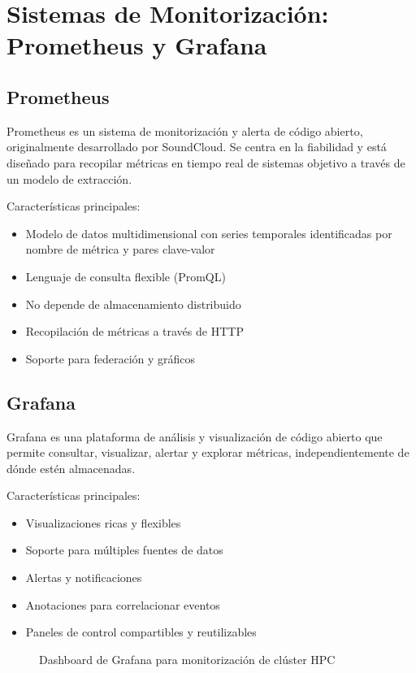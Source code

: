 \documentclass[12pt,a4paper]{report}
\begin{document}
\section{Sistemas de Monitorización: Prometheus y Grafana}

\subsection{Prometheus}

Prometheus es un sistema de monitorización y alerta de código abierto, originalmente desarrollado por SoundCloud. Se centra en la fiabilidad y está diseñado para recopilar métricas en tiempo real de sistemas objetivo a través de un modelo de extracción.

Características principales:
\begin{itemize}
    \item Modelo de datos multidimensional con series temporales identificadas por nombre de métrica y pares clave-valor
    \item Lenguaje de consulta flexible (PromQL)
    \item No depende de almacenamiento distribuido
    \item Recopilación de métricas a través de HTTP
    \item Soporte para federación y gráficos
\end{itemize}

\subsection{Grafana}

Grafana es una plataforma de análisis y visualización de código abierto que permite consultar, visualizar, alertar y explorar métricas, independientemente de dónde estén almacenadas.

Características principales:
\begin{itemize}
    \item Visualizaciones ricas y flexibles
    \item Soporte para múltiples fuentes de datos
    \item Alertas y notificaciones
    \item Anotaciones para correlacionar eventos
    \item Paneles de control compartibles y reutilizables
\end{itemize}

\begin{figure}[H]
\centering
\caption{Dashboard de Grafana para monitorización de clúster HPC}
\label{fig:grafana_dashboard}
\end{figure}
\end{document}
